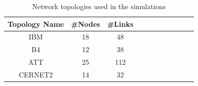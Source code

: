 \documentclass[sigconf]{acmart}
\begin{document}

\begin{table}
\centering
\caption{Network topologies used in the simulations}\label{evaluation-topologies}
\renewcommand{\arraystretch}{1.0}
\begin{tabular}{|c|c|c|c|c|c|c|c|c|c|c|} \hline
\setlength{\tabcolsep}{10pt}
\textbf{Topology Name}&\textbf{\#Nodes}&\textbf{\#Links}\\
\hline
IBM&18&48\\
\hline
B4&12&38\\
\hline
ATT&25&112\\
\hline
CERNET2&14&32\\
\hline
\end{tabular}
\end{table}
\end{document}
